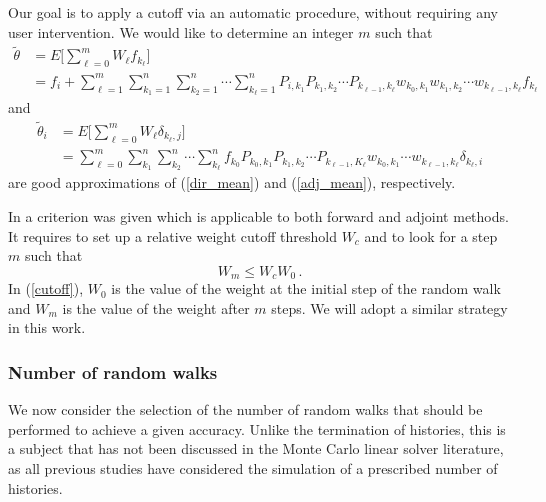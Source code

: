 \documentclass[times]{nlaauth}
\begin{document}
Our goal is to apply a cutoff via an automatic procedure, without requiring
any user intervention. We would like to determine
an integer $m$ such that
\[
\begin{array}{rl}
\tilde{\theta}&=E\bigg[\sum_{\ell=0}^m W_{\ell}
f_{k_{\ell}}\bigg]\\
& = f_i + {\displaystyle \sum_{\ell=1}^m
\sum_{k_1=1}^{n}\sum_{k_2=1}^n\cdots \sum_{k_{\ell}=1}^n
P_{i,k_1}P_{k_1,k_2}\cdots P_{k_{\ell-1},
k_{\ell}}w_{k_0,k_1}w_{k_1,k_2}\cdots
w_{k_{\ell-1}, k_{\ell}} f_{k_{\ell}}
}
\end{array}
\]
and %
\[
\begin{array}{rl}
\tilde{\theta}_i&=E\bigg[\sum_{\ell=0}^m W_{\ell}\delta_{k_{\ell},
j}\bigg]\\
& ={\displaystyle \sum_{\ell=0}^{m}\sum_{k_1}^n\sum_{k_2}^n\cdots\sum_{k_{\ell}}^n
f_{k_0}P_{k_0,k_1}P_{k_1,k_2}\cdots
P_{k_{\ell-1},K_{\ell}}w_{k_0,k_1}\cdots
w_{k_{\ell-1},k_{\ell}}\delta_{k_{\ell},i}
}
\end{array}
\]
are good approximations of (\ref{dir_mean}) and (\ref{adj_mean}), respectively.

In \cite{Slattery2013} a criterion was given which is applicable to both
forward and adjoint methods. It requires to set up a relative weight cutoff
threshold $W_c$ and to look for a step $m$ such that
\begin{equation}
W_m \le W_c W_0 \,.
\label{cutoff}
\end{equation}
In (\ref{cutoff}), $W_0$ is the value of the weight at the initial step of the random walk
and $W_m$ is the value of the weight after $m$ steps.
We will adopt a similar strategy in this work.

\subsubsection{Number of random walks}

We now consider the selection of the number of random walks that should be
performed to achieve a given accuracy. Unlike the termination of histories,
this is a subject that has not been discussed in the Monte Carlo linear
solver literature, as all previous studies have considered the simulation
of a prescribed number of histories.
\end{document}
